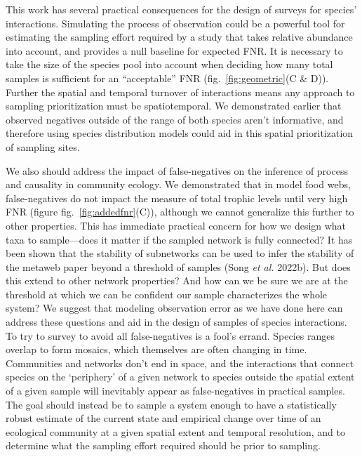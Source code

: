 \documentclass[11pt]{article}
\begin{document}
This work has several practical consequences for the design of surveys
for species' interactions. Simulating the process of observation could
be a powerful tool for estimating the sampling effort required by a
study that takes relative abundance into account, and provides a null
baseline for expected FNR. It is necessary to take the size of the
species pool into account when deciding how many total samples is
sufficient for an ``acceptable'' FNR (fig.~\ref{fig:geometric}(C \& D)).
Further the spatial and temporal turnover of interactions means any
approach to sampling prioritization must be spatiotemporal. We
demonstrated earlier that observed negatives outside of the range of
both species aren't informative, and therefore using species
distribution models could aid in this spatial prioritization of sampling
sites.

We also should address the impact of false-negatives on the inference of
process and causality in community ecology. We demonstrated that in
model food webs, false-negatives do not impact the measure of total
trophic levels until very high FNR (figure fig.~\ref{fig:addedfnr}(C)),
although we cannot generalize this further to other properties. This has
immediate practical concern for how we design what taxa to sample---does
it matter if the sampled network is fully connected? It has been shown
that the stability of subnetworks can be used to infer the stability of
the metaweb paper beyond a threshold of samples (Song \emph{et al.}
2022b). But does this extend to other network properties? And how can we
be sure we are at the threshold at which we can be confident our sample
characterizes the whole system? We suggest that modeling observation
error as we have done here can address these questions and aid in the
design of samples of species interactions. To try to survey to avoid all
false-negatives is a fool's errand. Species ranges overlap to form
mosaics, which themselves are often changing in time. Communities and
networks don't end in space, and the interactions that connect species
on the `periphery' of a given network to species outside the spatial
extent of a given sample will inevitably appear as false-negatives in
practical samples. The goal should instead be to sample a system enough
to have a statistically robust estimate of the current state and
empirical change over time of an ecological community at a given spatial
extent and temporal resolution, and to determine what the sampling
effort required should be prior to sampling.
\end{document}
